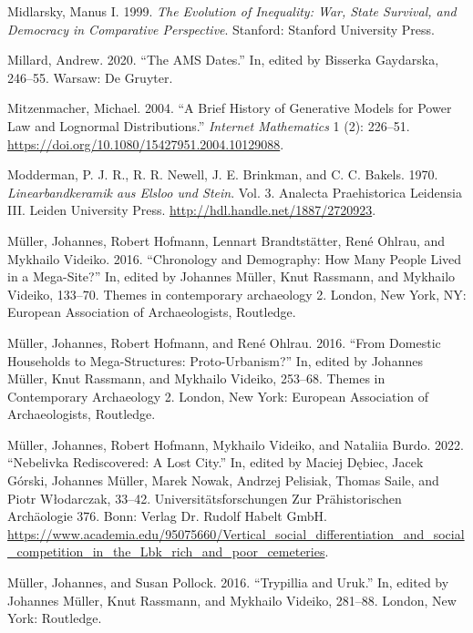 \documentclass[
  12pt,
  a4paper, twoside]{book}
\newlength{\cslhangindent}
\newlength{\cslentryspacingunit} %
\newenvironment{CSLReferences}[2] %
 {%
  \setlength{\parindent}{0pt}
  \ifodd #1
  \let\oldpar\par
  \def\par{\hangindent=\cslhangindent\oldpar}
  \fi
  \setlength{\parskip}{#2\cslentryspacingunit}
 }%
 {}
\begin{document}
\begin{CSLReferences}{1}{0}
\leavevmode{}%
Midlarsky, Manus I. 1999. \emph{The Evolution of Inequality: War, State Survival, and Democracy in Comparative Perspective}. Stanford: Stanford University Press.

\leavevmode{}%
Millard, Andrew. 2020. {``The AMS Dates.''} In, edited by Bisserka Gaydarska, 246--55. Warsaw: De Gruyter.

\leavevmode{}%
Mitzenmacher, Michael. 2004. {``A Brief History of Generative Models for Power Law and Lognormal Distributions.''} \emph{Internet Mathematics} 1 (2): 226--51. \url{https://doi.org/10.1080/15427951.2004.10129088}.

\leavevmode{}%
Modderman, P. J. R., R. R. Newell, J. E. Brinkman, and C. C. Bakels. 1970. \emph{Linearbandkeramik aus Elsloo und Stein}. Vol. 3. Analecta Praehistorica Leidensia III. Leiden University Press. \url{http://hdl.handle.net/1887/2720923}.

\leavevmode{}%
Müller, Johannes, Robert Hofmann, Lennart Brandtstätter, René Ohlrau, and Mykhailo Videiko. 2016. {``Chronology and Demography: How Many People Lived in a Mega-Site?''} In, edited by Johannes Müller, Knut Rassmann, and Mykhailo Videiko, 133--70. Themes in contemporary archaeology 2. London, New York, NY: European Association of Archaeologists, Routledge.

\leavevmode{}%
Müller, Johannes, Robert Hofmann, and René Ohlrau. 2016. {``From Domestic Households to Mega-Structures: Proto-Urbanism?''} In, edited by Johannes Müller, Knut Rassmann, and Mykhailo Videiko, 253--68. Themes in Contemporary Archaeology 2. London, New York: European Association of Archaeologists, Routledge.

\leavevmode{}%
Müller, Johannes, Robert Hofmann, Mykhailo Videiko, and Nataliia Burdo. 2022. {``Nebelivka {\textendash} Rediscovered: A Lost City.''} In, edited by Maciej Dębiec, Jacek Górski, Johannes Müller, Marek Nowak, Andrzej Pelisiak, Thomas Saile, and Piotr Włodarczak, 33--42. Universitätsforschungen Zur Prähistorischen Archäologie 376. Bonn: Verlag Dr. Rudolf Habelt GmbH. \url{https://www.academia.edu/95075660/Vertical_social_differentiation_and_social_competition_in_the_Lbk_rich_and_poor_cemeteries}.

\leavevmode{}%
Müller, Johannes, and Susan Pollock. 2016. {``Trypillia and Uruk.''} In, edited by Johannes Müller, Knut Rassmann, and Mykhailo Videiko, 281--88. London, New York: Routledge.


\end{CSLReferences}
\end{document}
